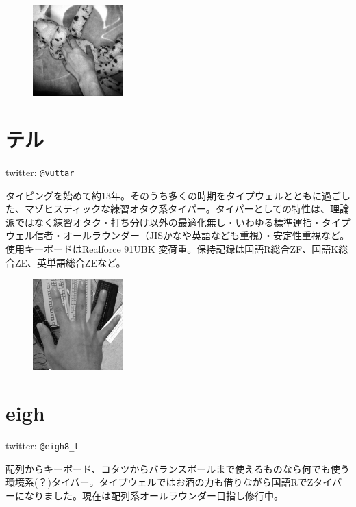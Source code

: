 \clearpage

\begin{figure}
\includegraphics[width=3.5cm,clip]{res_author/vuttar_temoto.eps}
\end{figure}
\section*{テル}
twitter: \verb|@vuttar|

タイピングを始めて約13年。そのうち多くの時期をタイプウェルとともに過ごした、マゾヒスティックな練習オタク系タイパー。タイパーとしての特性は、理論派ではなく練習オタク・打ち分け以外の最適化無し・いわゆる標準運指・タイプウェル信者・オールラウンダー（JISかなや英語なども重視）・安定性重視など。使用キーボードはRealforce 91UBK 変荷重。保持記録は国語R総合ZF、国語K総合ZE、英単語総合ZEなど。

\vspace{5mm}

\begin{figure}
\includegraphics[width=3.5cm,clip]{res_author/eigh8_t_temoto.eps}
\end{figure}
\section*{eigh}
twitter: \verb|@eigh8_t|

配列からキーボード、コタツからバランスボールまで使えるものなら何でも使う環境系(？)タイパー。タイプウェルではお酒の力も借りながら国語RでZタイパーになりました。現在は配列系オールラウンダー目指し修行中。
 \\
 \\

\vspace{5mm}

